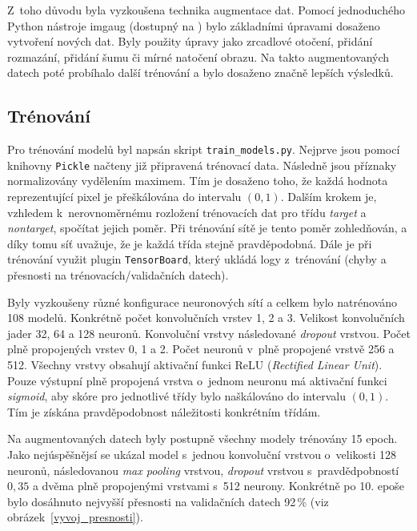 \documentclass{article}
\begin{document}
Z~toho důvodu byla vyzkoušena technika augmentace dat.
Pomocí jednoduchého Python nástroje imgaug (dostupný na )
bylo základními úpravami dosaženo vytvoření nových dat.
Byly použity úpravy jako zrcadlové otočení, přidání rozmazání, přidání šumu
či mírné natočení obrazu.
Na takto augmentovaných datech poté probíhalo další trénování a bylo dosaženo
značně lepších výsledků.

\subsection{Trénování} \label{trenovani}

Pro trénování modelů byl napsán skript \texttt{train\_models.py}.
Nejprve jsou pomocí knihovny \texttt{Pickle} načteny již připravená trénovací data.
Následně jsou příznaky normalizovány vydělením maximem.
Tím je dosaženo toho, že každá hodnota reprezentující pixel je přeškálována
do intervalu $(0,1)$.
Dalším krokem je, vzhledem k~nerovnoměrnému rozložení trénovacích dat
pro třídu \textit{target} a \textit{nontarget}, spočítat jejich poměr.
Při trénování sítě je tento poměr zohledňován, a díky tomu síť uvažuje,
že je každá třída stejně pravděpodobná.
Dále je při trénování využit plugin \texttt{TensorBoard},
který ukládá logy z~trénování (chyby a přesnosti na trénovacích/validačních datech).

Byly vyzkoušeny různé konfigurace neuronových sítí a celkem bylo natrénováno 108 modelů.
Konkrétně počet konvolučních vrstev 1, 2 a 3.
Velikost konvolučních jader 32, 64 a 128 neuronů.
Konvoluční vrstvy následované \textit{dropout} vrstvou.
Počet plně propojených vrstev 0, 1 a 2.
Počet neuronů v~plně propojené vrstvě 256 a 512.
Všechny vrstvy obsahují aktivační funkci ReLU (\textit{Rectified Linear Unit}).
Pouze výstupní plně propojená vrstva o~jednom neuronu má aktivační funkci \textit{sigmoid},
aby skóre pro jednotlivé třídy bylo naškálováno do intervalu $(0,1)$.
Tím je získána pravděpodobnost náležitosti konkrétním třídám.

Na augmentovaných datech byly postupně všechny modely trénovány 15 epoch.
Jako nejúspěšnějsí se ukázal model s~jednou konvoluční vrstvou o~velikosti 128 neuronů,
následovanou \textit{max pooling} vrstvou, \textit{dropout} vrstvou s~pravdědpobností $0,35$
a dvěma plně propojenými vrstvami s~512 neurony.
Konkrétně po 10. epoše bylo dosáhnuto nejvyšší přesnosti na validačních datech 92\,\%
(viz obrázek~\ref{vyvoj_presnosti}).
\end{document}

